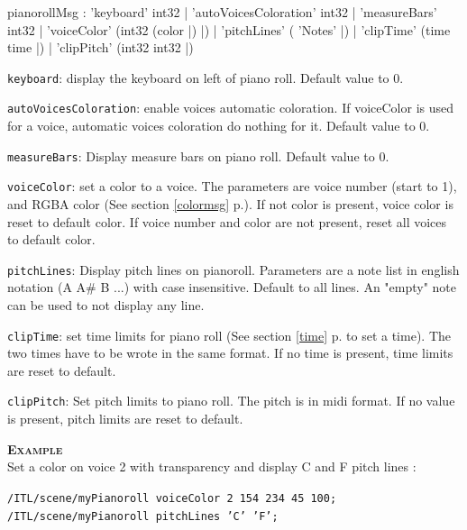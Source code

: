 \documentclass[a4paper,twoside]{report}
\newcommand{\fullref}[1]	{\ref{#1} p.\pageref{#1}}
\newcommand{\OSC}[1]		{\texttt{#1}}
\newcommand{\example}		{\textbf{\hspace{-1.5cm}\textbf{\textsc{Example }}}}
\let\olditemize\itemize
\let\oldenditemize\enditemize
\renewenvironment{itemize} 	{\olditemize \setlength{\itemsep}{1mm}}{\oldenditemize}
\newcommand{\sample}	[1]			{\vspace{-2mm}\begin{center}\colorbox{mygrey}{
								\begin{minipage}[t]{0.9\columnwidth} 
								{\small \texttt{#1}}
								\end{minipage}}\end{center}}
\begin{document}
\begin{rail}
pianorollMsg :		'keyboard' int32
			| 'autoVoicesColoration' int32
			| 'measureBars' int32
			| 'voiceColor' (int32 (color |) |)
			| 'pitchLines' ( 'Notes' |)
			| 'clipTime' (time time |)
			| 'clipPitch' (int32 int32 |)
\end{rail}


\begin{itemize}
\item \OSC{keyboard}: display the keyboard on left of piano roll. Default value to 0.
\item \OSC{autoVoicesColoration}: enable voices automatic coloration. If voiceColor is used for a voice, automatic voices coloration do nothing for it. Default value to 0.
\item \OSC{measureBars}: Display measure bars on piano roll. Default value to 0.
\item \OSC{voiceColor}: set a color to a voice. The parameters are voice number (start to 1), and RGBA color (See section \fullref{colormsg}). If not color is present, voice color is reset to default color. If voice number and color are not present, reset all voices to default color.
\item \OSC{pitchLines}:  Display pitch lines on pianoroll. Parameters are a note list in english notation (A A\# B ...) with case insensitive. Default to all lines. An "empty" note can be used to not display any line.
\item \OSC{clipTime}: set time limits for piano roll (See section \fullref{time} to set a time). The two times have to be wrote in the same format. If no time is present, time limits are reset to default.
\item \OSC{clipPitch}:  Set pitch limits to piano roll. The pitch is in midi format. If no value is present, pitch limits are reset to default.
\end{itemize}


\example \\
Set a color on voice 2 with transparency and display C and F pitch lines : 
\sample{/ITL/scene/myPianoroll voiceColor 2 154 234 45 100;\\
/ITL/scene/myPianoroll pitchLines 'C' 'F';
}
\end{document}
